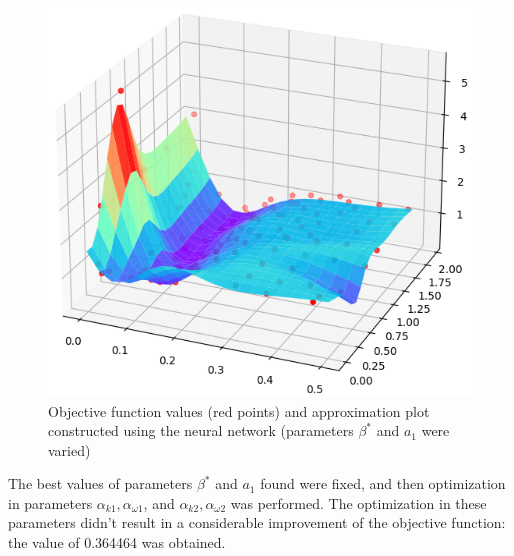 \documentclass[sensors,article,submit,moreauthors,pdftex]{Definitions/mdpi}
\begin{document}
\begin{figure}[H]
\begin{center}
\includegraphics[width=0.8\linewidth]{NN_100_point_.png}
\caption{Objective function values (red points) and approximation plot constructed using the neural network (parameters $\beta^*$ and $a_1$ were varied)}
\label{NN_100_point}
\end{center}
\end{figure}

The best values of parameters $\beta^*$ and $a_1$ found were fixed, and then optimization in parameters $\alpha_{k1}, \alpha_{\omega1}$, and $\alpha_{k2}, \alpha_{\omega2}$ was performed. 
The optimization in these parameters didn't result in a considerable improvement of the objective function: the value of 0.364464 was obtained.


%
%
\end{document}

